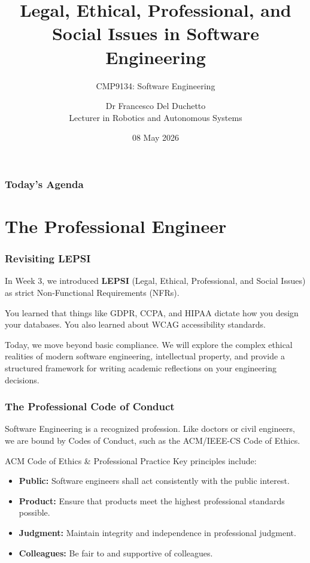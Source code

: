 \documentclass[xcolor=table]{beamer}
\title[CMP9134 - Week 14]{Legal, Ethical, Professional, and Social Issues in Software Engineering}
\subtitle{CMP9134: Software Engineering}
\author[Francesco Del Duchetto]{Dr Francesco Del Duchetto\\Lecturer in Robotics and Autonomous Systems}
\institute[University of Lincoln]{University of Lincoln}
\date{08 May 2026}
\begin{document}
\begin{frame}
    \titlepage
\end{frame}

\begin{frame}
    \frametitle{Today's Agenda}
    \tableofcontents
\end{frame}

\section{The Professional Engineer}

\begin{frame}
    \frametitle{Revisiting LEPSI}
    In Week 3, we introduced \textbf{LEPSI} (Legal, Ethical, Professional, and Social Issues) as strict Non-Functional Requirements (NFRs).
    
    \vspace{0.3cm}
    You learned that things like GDPR, CCPA, and HIPAA dictate how you design your databases. You also learned about WCAG accessibility standards.
    
    \vspace{0.3cm}
    Today, we move beyond basic compliance. We will explore the complex ethical realities of modern software engineering, intellectual property, and provide a structured framework for writing academic reflections on your engineering decisions.
\end{frame}

\begin{frame}
    \frametitle{The Professional Code of Conduct}
    \small
    Software Engineering is a recognized profession. Like doctors or civil engineers, we are bound by Codes of Conduct, such as the ACM/IEEE-CS Code of Ethics.
    
    \vspace{0.2cm}
    \begin{block}{ACM Code of Ethics \& Professional Practice}
        Key principles include:
        \begin{itemize}
            \item \textbf{Public:} Software engineers shall act consistently with the public interest.
            \item \textbf{Product:} Ensure that products meet the highest professional standards possible.
            \item \textbf{Judgment:} Maintain integrity and independence in professional judgment.
            \item \textbf{Colleagues:} Be fair to and supportive of colleagues.
        \end{itemize}
    \end{block}
\end{frame}
\end{document}

